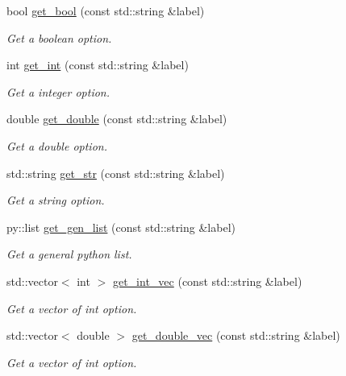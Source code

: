 \begin{DoxyCompactItemize}
\item 
bool \mbox{\hyperlink{classforte_1_1_forte_options_a0cc337e09077f5abad7170342aafbae0}{get\+\_\+bool}} (const std\+::string \&label)
\begin{DoxyCompactList}\small\item\em Get a boolean option. \end{DoxyCompactList}\item 
int \mbox{\hyperlink{classforte_1_1_forte_options_afc7de0007819e021d3f7461535cda476}{get\+\_\+int}} (const std\+::string \&label)
\begin{DoxyCompactList}\small\item\em Get a integer option. \end{DoxyCompactList}\item 
double \mbox{\hyperlink{classforte_1_1_forte_options_a40f154eb54ccc9ad7654009d327c7b9a}{get\+\_\+double}} (const std\+::string \&label)
\begin{DoxyCompactList}\small\item\em Get a double option. \end{DoxyCompactList}\item 
std\+::string \mbox{\hyperlink{classforte_1_1_forte_options_a4442d17f7a49bb6d85ee20accfa88c9e}{get\+\_\+str}} (const std\+::string \&label)
\begin{DoxyCompactList}\small\item\em Get a string option. \end{DoxyCompactList}\item 
py\+::list \mbox{\hyperlink{classforte_1_1_forte_options_adfc4856975eff33632ea936f8e58f394}{get\+\_\+gen\+\_\+list}} (const std\+::string \&label)
\begin{DoxyCompactList}\small\item\em Get a general python list. \end{DoxyCompactList}\item 
std\+::vector$<$ int $>$ \mbox{\hyperlink{classforte_1_1_forte_options_a4bdd63f32f4c0a81d23ab46bbec5a38c}{get\+\_\+int\+\_\+vec}} (const std\+::string \&label)
\begin{DoxyCompactList}\small\item\em Get a vector of int option. \end{DoxyCompactList}\item 
std\+::vector$<$ double $>$ \mbox{\hyperlink{classforte_1_1_forte_options_ab0470ac133ac57968be2c4ac780bc91c}{get\+\_\+double\+\_\+vec}} (const std\+::string \&label)
\begin{DoxyCompactList}\small\item\em Get a vector of int option. \end{DoxyCompactList}\item 

\end{DoxyCompactItemize}
